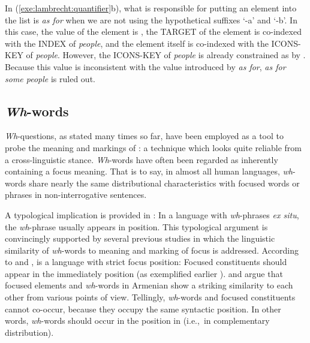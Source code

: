 \noindent In (\ref{exe:lambrecht:quantifier}b), what is responsible
for putting an  element into the  list is
\textit{as for} when we are not using the hypothetical suffixes `-a'
and `-b'. In this case, the  value of the element is
, the TARGET of the element is co-indexed with the INDEX of
\textit{people}, and the element itself is co-indexed with the
ICONS-KEY of \textit{people}. However, the ICONS-KEY of
\textit{people} is already constrained as  by
. Because this value is inconsistent with the
 value introduced by \textit{as for}, \textit{as for some
  people} is ruled out.


\subsection{\textit{Wh}-words}
\label{10:sssec:wh}


\textit{Wh}-questions, 
as stated many times so far, have been employed
as a tool to probe the meaning and markings of : a technique
which looks quite reliable from a cross-linguistic stance.
\textit{Wh}-words have often been regarded as inherently containing a
focus meaning. That is to say, in almost all human languages,
\textit{wh}-words share nearly the same distributional characteristics
with focused words or phrases in non-interrogative sentences.




A typological implication is provided in \citet[p.\ 5]{drubig:03}: In
a language with \textit{wh}-phrases \textit{ex situ}, the
\textit{wh}-phrase usually appears in  position. This typological
argument is convincingly supported by several previous studies in
which the linguistic similarity of \textit{wh}-words to meaning and
marking of focus is addressed.  According to \citet{comrie:84} and
\citet{buring:10},  is a language with strict focus
position: Focused constituents should appear in the immediately
 position (as exemplified earlier ).
\citet{tamrazian:91} and \citet{megerdoomian:11} argue that focused
elements and \textit{wh}-words in Armenian show a striking similarity
to each other from various points of view.
Tellingly, \textit{wh}-words and focused constituents cannot co-occur,
because they occupy the same syntactic position. In other words, \textit{wh}-words should occur in the
 position in  (i.e.,\ in complementary distribution).



